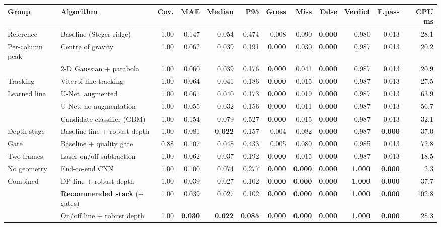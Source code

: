 \begin{tabular}{@{}llrrrrrrrrrr@{}}
\toprule
Group & Algorithm & Cov. & MAE & Median & P95 & Gross & Miss & False & Verdict & F.pass & CPU ms \\
\midrule
Reference & Baseline (Steger ridge) & 1.00 & 0.147 & 0.054 & 0.474 & 0.008 & 0.090 & \textbf{0.000} & 0.980 & 0.013 & 28.1 \\
\addlinespace[2pt]
Per-column peak & Centre of gravity & 1.00 & 0.062 & 0.039 & 0.191 & \textbf{0.000} & 0.030 & \textbf{0.000} & 0.987 & 0.013 & 20.2 \\
 & 2-D Gaussian + parabola & 1.00 & 0.060 & 0.039 & 0.176 & \textbf{0.000} & 0.041 & \textbf{0.000} & 0.987 & 0.013 & 20.9 \\
\addlinespace[2pt]
Tracking & Viterbi line tracking & 1.00 & 0.064 & 0.041 & 0.186 & \textbf{0.000} & 0.015 & \textbf{0.000} & 0.987 & 0.013 & 27.5 \\
\addlinespace[2pt]
Learned line & U-Net, augmented & 1.00 & 0.061 & 0.040 & 0.173 & \textbf{0.000} & 0.019 & \textbf{0.000} & 0.987 & 0.013 & 63.9 \\
 & U-Net, no augmentation & 1.00 & 0.055 & 0.032 & 0.156 & \textbf{0.000} & 0.011 & \textbf{0.000} & 0.987 & 0.013 & 56.7 \\
 & Candidate classifier (GBM) & 1.00 & 0.154 & 0.079 & 0.527 & \textbf{0.000} & 0.015 & \textbf{0.000} & 0.987 & 0.013 & 32.1 \\
\addlinespace[2pt]
Depth stage & Baseline line + robust depth & 1.00 & 0.081 & \textbf{0.022} & 0.157 & 0.004 & 0.082 & \textbf{0.000} & 0.987 & \textbf{0.000} & 37.0 \\
\addlinespace[2pt]
Gate & Baseline + quality gate & 0.88 & 0.107 & 0.048 & 0.433 & 0.005 & 0.080 & \textbf{0.000} & 0.985 & 0.013 & 72.8 \\
\addlinespace[2pt]
Two frames & Laser on/off subtraction & 1.00 & 0.062 & 0.037 & 0.192 & \textbf{0.000} & 0.015 & \textbf{0.000} & 0.987 & 0.013 & 18.5 \\
\addlinespace[2pt]
No geometry & End-to-end CNN & 1.00 & 0.100 & 0.074 & 0.277 & \textbf{0.000} & \textbf{0.000} & \textbf{0.000} & \textbf{1.000} & \textbf{0.000} & 2.3 \\
\addlinespace[2pt]
Combined & DP line + robust depth & 1.00 & 0.039 & 0.027 & 0.102 & \textbf{0.000} & \textbf{0.000} & \textbf{0.000} & \textbf{1.000} & \textbf{0.000} & 37.7 \\
 & \textbf{Recommended stack} (+ gates) & 1.00 & 0.039 & 0.027 & 0.102 & \textbf{0.000} & \textbf{0.000} & \textbf{0.000} & \textbf{1.000} & \textbf{0.000} & 102.8 \\
 & On/off line + robust depth & 1.00 & \textbf{0.030} & \textbf{0.022} & \textbf{0.085} & \textbf{0.000} & \textbf{0.000} & \textbf{0.000} & \textbf{1.000} & \textbf{0.000} & 28.3 \\
\bottomrule
\end{tabular}
